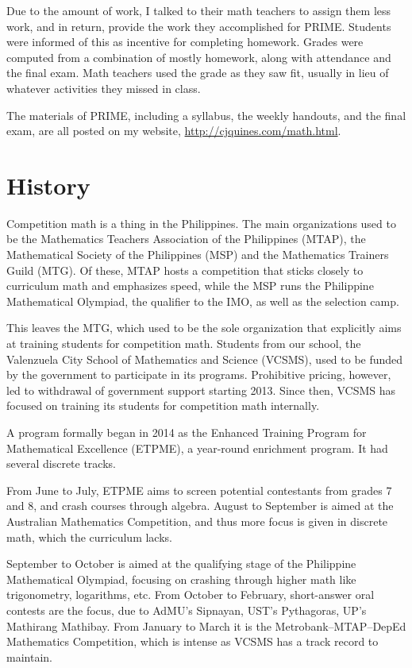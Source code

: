 \documentclass[11pt,paper=letter]{scrartcl}
\begin{document}
Due to the amount of work, I talked to their math teachers to assign them less work, and in return, provide the work they accomplished for PRIME. Students were informed of this as incentive for completing homework. Grades were computed from a combination of mostly homework, along with attendance and the final exam. Math teachers used the grade as they saw fit, usually in lieu of whatever activities they missed in class.

The materials of PRIME, including a syllabus, the weekly handouts, and the final exam, are all posted on my website, \url{http://cjquines.com/math.html}.

\section{History}

Competition math is a thing in the Philippines. The main organizations used to be the Mathematics Teachers Association of the Philippines (MTAP), the Mathematical Society of the Philippines (MSP) and the Mathematics Trainers Guild (MTG). Of these, MTAP hosts a competition that sticks closely to curriculum math and emphasizes speed, while the MSP runs the Philippine Mathematical Olympiad, the qualifier to the IMO, as well as the selection camp. 

This leaves the MTG, which used to be the sole organization that explicitly aims at training students for competition math. Students from our school, the Valenzuela City School of Mathematics and Science (VCSMS), used to be funded by the government to participate in its programs. Prohibitive pricing, however, led to withdrawal of government support starting 2013. Since then, VCSMS has focused on training its students for competition math internally.

A program formally began in 2014 as the Enhanced Training Program for Mathematical Excellence (ETPME), a year-round enrichment program. It had several discrete tracks.

From June to July, ETPME aims to screen potential contestants from grades 7 and 8, and crash courses through algebra. August to September is aimed at the Australian Mathematics Competition, and thus more focus is given in discrete math, which the curriculum lacks.

September to October is aimed at the qualifying stage of the Philippine Mathematical Olympiad, focusing on crashing through higher math like trigonometry, logarithms, etc. From October to February, short-answer oral contests are the focus, due to AdMU's Sipnayan, UST's Pythagoras, UP's Mathirang Mathibay. From January to March it is the Metrobank--MTAP--DepEd Mathematics Competition, which is intense as VCSMS has a track record to maintain.
\end{document}
